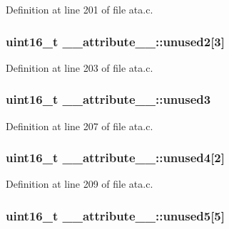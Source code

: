 Definition at line 201 of file ata.\+c.

\subsubsection[{\texorpdfstring{unused2}{unused2}}]{\setlength{\rightskip}{0pt plus 5cm}uint16\+\_\+t \+\_\+\+\_\+attribute\+\_\+\+\_\+\+::unused2\mbox{[}3\mbox{]}}\hypertarget{struct____attribute_____a18f24001adf4149e889ed86a8cbaff54}{}\label{struct____attribute_____a18f24001adf4149e889ed86a8cbaff54}


Definition at line 203 of file ata.\+c.

\subsubsection[{\texorpdfstring{unused3}{unused3}}]{\setlength{\rightskip}{0pt plus 5cm}uint16\+\_\+t \+\_\+\+\_\+attribute\+\_\+\+\_\+\+::unused3}\hypertarget{struct____attribute_____a5e3c3ed46d04f2818d5d3edcf9b0300f}{}\label{struct____attribute_____a5e3c3ed46d04f2818d5d3edcf9b0300f}


Definition at line 207 of file ata.\+c.

\subsubsection[{\texorpdfstring{unused4}{unused4}}]{\setlength{\rightskip}{0pt plus 5cm}uint16\+\_\+t \+\_\+\+\_\+attribute\+\_\+\+\_\+\+::unused4\mbox{[}2\mbox{]}}\hypertarget{struct____attribute_____a0b098ce1ed9de8d4a04ebb0868821517}{}\label{struct____attribute_____a0b098ce1ed9de8d4a04ebb0868821517}


Definition at line 209 of file ata.\+c.

\subsubsection[{\texorpdfstring{unused5}{unused5}}]{\setlength{\rightskip}{0pt plus 5cm}uint16\+\_\+t \+\_\+\+\_\+attribute\+\_\+\+\_\+\+::unused5\mbox{[}5\mbox{]}}\hypertarget{struct____attribute_____a7ba552a7e1c4b9a14f34db29c9804f78}{}\label{struct____attribute_____a7ba552a7e1c4b9a14f34db29c9804f78}


